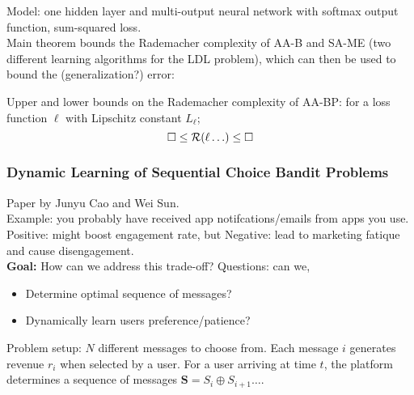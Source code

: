 
Model: one hidden layer and multi-output neural network with softmax output function, sum-squared loss. \\


Main theorem bounds the Rademacher complexity of AA-B and SA-ME (two different learning algorithms for the LDL problem), which can then be used to bound the (generalization?) error:
\begin{theorem}
Upper and lower bounds on the Rademacher complexity of AA-BP: for a loss function $\ell$ with Lipschitz constant $L_\ell$;
\[
\square \leq \mathcal{R}(\ell \ldots ) \leq \square
\]
\end{theorem}


\subsubsection{Dynamic Learning of Sequential Choice Bandit Problems}

Paper by Junyu Cao and Wei Sun. \\

Example: you probably have received app notifcations/emails from apps you use. Positive: might boost engagement rate, but Negative: lead to marketing fatique and cause disengagement. \\


{\bf Goal:} How can we address this trade-off? Questions: can we,
\begin{itemize}
    \item Determine optimal sequence of messages?
    \item Dynamically learn users preference/patience?
\end{itemize}

Problem setup: $N$ different messages to choose from. Each message $i$ generates revenue $r_i$ when selected by a user. For a user arriving at time $t$, the platform determines a sequence of messages $\bm{S} = S_i \oplus S_{i+1} \ldots$. \\


